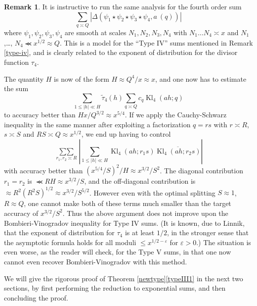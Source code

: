 \documentclass[12pt,a4paper,reqno]{amsart}
\numberwithin{equation}{section}
\DeclareMathOperator{\hypk}{Kl}
\theoremstyle{plain}
\theoremstyle{definition}
\newtheorem{remark}[theorem]{Remark}
\newcommand\eps{\varepsilon}
\newcommand\sumsum{\mathop{\sum\sum}\limits}
\renewcommand{\sim}{\asymp}
\renewcommand{\lessapprox}{\llcurly}
\begin{document}

\begin{remark}\label{higher-type} It is instructive to run the same
  analysis for the fourth order sum
$$ 
\sum_{q \sim Q} |\Delta( \psi_1 \star \psi_2 \star \psi_3 \star
\psi_4,a\ (q))|
$$ 
where $\psi_1,\psi_2,\psi_3,\psi_4$ are smooth at scales
$N_1,N_2,N_3,N_4$ with $N_1 \ldots N_4 \sim x$ and $N_1$ ,\ldots, $N_4
\lessapprox x^{1/2} \approx Q$. This is a model for the ``Type IV''
sums mentioned in Remark \ref{type-iv}, and is clearly related to the
exponent of distribution for the divisor function $\tau_4$. 
\par
The quantity $H$ is now of the form $H \approx Q^4/x \approx x$, and
one now has to estimate the sum
$$ 
\sum_{1\leq |h|\ll H} \tilde \tau_4(h) \sum_{q \sim Q} c_q
\hypk_4(ah;q)
$$ 
to accuracy better than $H x / Q^{3/2} \approx x^{5/4}$.  If we apply
the Cauchy-Schwarz inequality in the same manner after exploiting a
factorization $q=rs$ with $r\sim R$, $s\sim S$ and $RS \sim Q \approx
x^{1/2}$, we end up having to control
$$ 
\sumsum_{r_1,r_2 \sim R} \left|\sum_{1\leq |h|\ll H} \hypk_4(ah;r_1s)
  \overline{\hypk_4(ah;r_2s)}\right|
$$ 
with accuracy better than $(x^{5/4}/S)^2 / H \approx x^{3/2}/S^2$.
The diagonal contribution $r_1=r_2$ is $\lessapprox RH \approx
x^{3/2}/S$, and the off-diagonal contribution is $\approx R^2
(R^2S)^{1/2} \approx x^{3/2} / S^{5/2}$. However even with the optimal
splitting $S \approx 1$, $R \approx Q$, one cannot make both of these
terms much smaller than the target accuracy of $x^{3/2}/S^2$.  Thus
the above argument does not improve upon the Bombieri-Vinogradov
inequality for Type IV sums.  (It is known, due to Linnik, that the
exponent of distribution for $\tau_4$ is at least $1/2$, in the
stronger sense that the asymptotic formula holds for all moduli $\leq
x^{1/2-\eps}$ for $\eps>0$.)  The situation is even worse, as the
reader will check, for the Type V sums, in that one now cannot even
recover Bombieri-Vinogradov with this method.
\end{remark}

We will give the rigorous proof of Theorem
\ref{newtype}\eqref{typeIII1} in the next two sections, by first
performing the reduction to exponential sums, and then concluding the
proof.
\end{document}
